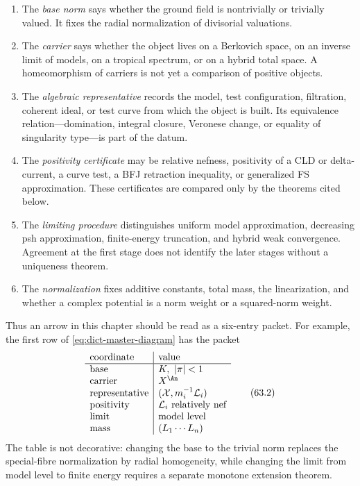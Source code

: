 \begin{enumerate}
\item The \emph{base norm} says whether the ground field is nontrivially or
trivially valued.  It fixes the radial normalization of divisorial
valuations.

\item The \emph{carrier} says whether the object lives on a Berkovich space,
on an inverse limit of models, on a tropical spectrum, or on a hybrid total
space.  A homeomorphism of carriers is not yet a comparison of positive
objects.

\item The \emph{algebraic representative} records the model, test
configuration, filtration, coherent ideal, or test curve from which the
object is built.  Its equivalence relation---domination, integral closure,
Veronese change, or equality of singularity type---is part of the datum.

\item The \emph{positivity certificate} may be relative nefness, positivity
of a CLD or delta-current, a curve test, a BFJ retraction inequality, or
generalized FS approximation.  These certificates are compared only by the
theorems cited below.

\item The \emph{limiting procedure} distinguishes uniform model
approximation, decreasing psh approximation, finite-energy truncation, and
hybrid weak convergence.  Agreement at the first stage does not identify
the later stages without a uniqueness theorem.

\item The \emph{normalization} fixes additive constants, total mass, the
linearization, and whether a complex potential is a norm weight or a
squared-norm weight.
\end{enumerate}

Thus an arrow in this chapter should be read as a six-entry packet.  For
example, the first row of \eqref{eq:dict-master-diagram} has the packet
\[
\begin{array}{l|l}
\text{coordinate}&\text{value}\\
\hline
\text{base}&K,\ |\pi|<1\\
\text{carrier}&X^{\An}\\
\text{representative}&(\mathcal X,m_i^{-1}\mathcal L_i)\\
\text{positivity}&\mathcal L_i\text{ relatively nef}\\
\text{limit}&\text{model level}\\
\text{mass}&(L_1\cdots L_n)
\end{array}
\tag{63.2}\label{eq:dict-six-coordinate-packet}
\]
The table is not decorative: changing the base to the trivial norm replaces
the special-fibre normalization by radial homogeneity, while changing the
limit from model level to finite energy requires a separate monotone
extension theorem.

